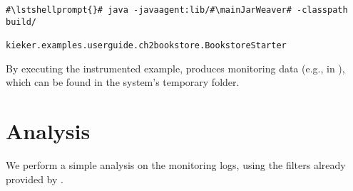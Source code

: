 		\setBashListing
		\begin{lstlisting}[gobble=6,caption=Command to run the Bookstore]			
			#\lstshellprompt{}# java -javaagent:lib/#\mainJarWeaver# -classpath build/
			    kieker.examples.userguide.ch2bookstore.BookstoreStarter
		\end{lstlisting} 
		
		\noindent
		By executing the instrumented example, \Kieker{} produces monitoring data (e.g., in ), which can be found in the system's temporary folder.
	
	\section{Analysis}
	
		We perform a simple analysis on the monitoring logs, using the filters already provided by \Kieker{}.